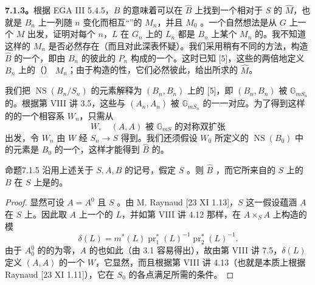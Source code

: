 \textbf{7.1.3。}根据 EGA III 5.4.5，$B$ 的意味着可以在 $\widehat B$ 上找到一个相对于 $S$ 的 $\widehat M$，也就是 $B_n$ 上一列随 $n$ 变化而相互“”的 $M_n$，并且 $M_0$ 。一个自然想法是从 $G$ 上一个 $M$ 出发，证明对每个 $n$，$L$ 在 $G_n$ 上的 $L_n$ 都是 $B_n$ 上某个 $M_n$ 的。我不知道这样的 $M_n$ 是否必然存在（而且对此深表怀疑）。我们采用稍有不同的方法，构造 $\widehat B$ 的一个，即由 $B_n$ 的彼此的 $P_n$ 构成的一个。这时已知 [5]，这些的两倍地定义 $B_n$ 上的（） $M_n$；由于构造的性，它们必然彼此，给出所求的 $\widehat M$。

我们把 $\operatorname{NS}(B_n/S_n)$ 的元素解释为 $(B_n,B_n)$ 上的 [5]，即 $(B_n,B_n)$ 被 $\mathbb G_{mS_n}$ 的。根据第 VIII 讲 3.5，这些与 $(A_n,A_n)$ 被 $\mathbb G_{mS_n}$ 的一一对应。为了得到这样的的一个相容系 $W_n$，只需从
\begin{equation}\tag{7.1.4}
 W,\quad (A,A)\text{ 被 }\mathbb G_{mS}\text{ 的对称双扩张}
\end{equation}
出发，令 $W_n$ 由 $W$ 经 $S_n\to S$ 得到。我们还须假设 $W_0$ 所定义的 $\operatorname{NS}(B_0)$ 中的元素是 $B_0$ 的一个，这样才能得到 $\widehat B$ 的。

\begin{SGAresult}{命题}{7.1.5}
沿用上述关于 $S,A,\widehat B$ 的记号，假定 $S$ 。则 $\widehat B$ ，而它所来自的 $S$ 上的 $B$ 在 $S$ 上是的。
\end{SGAresult}
\begin{proof}
显然可设 $A=A^0$ 且 $S$ 。由 M. Raynaud [23 XI 1.13]，$S$ 这一假设蕴涵 $A$ 在 $S$ 上。因此取 $A$ 上一个的 $L$，并如第 VIII 讲 4.12 那样，在 $A\times_S A$ 上构造的模
\[
 \delta(L)=m^*(L)\operatorname{pr}_1^*(L)^{-1}\operatorname{pr}_2^*(L)^{-1}.
\]
由于 $A_0^0$ 的的为零，$A$ 的也如此（由 3.1 容易得出），故由第 VIII 讲 7.5，$\delta(L)$ 定义 $(A,A)$ 的一个 $W$，它显然，而且根据第 VIII 讲 4.13（也就是本质上根据 Raynaud [23 XI 1.11]），它在 $S_0$ 的各点满足所需的条件。
\end{proof}

